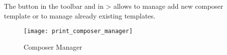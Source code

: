The   button in the
toolbar and in  >
 allows to manage
add new composer template or to manage already existing templates. 

\begin{figure}[h]
   \begin{center}
   \caption{Composer Manager \nixcaption}
   \label{fig:print_composer_manager}\smallskip
   \texttt{[image: print\_composer\_manager]}
\end{center}
\end{figure}

